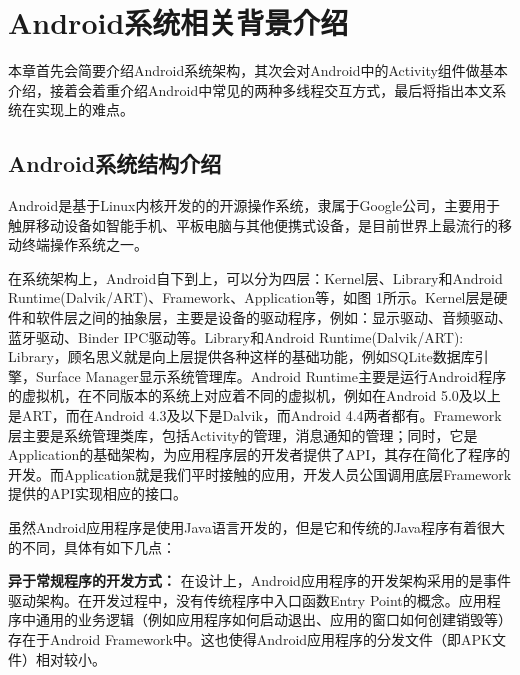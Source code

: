 \section{Android系统相关背景介绍 }  
\label{ch2}


本章首先会简要介绍Android系统架构，其次会对Android中的Activity组件做基本介绍，接着会着重介绍Android中常见的两种多线程交互方式，最后将指出本文系统在实现上的难点。

\subsection{Android系统结构介绍}

Android是基于Linux内核开发的的开源操作系统，隶属于Google公司，主要用于触屏移动设备如智能手机、平板电脑与其他便携式设备，是目前世界上最流行的移动终端操作系统之一。

在系统架构上，Android自下到上，可以分为四层：Kernel层、Library和Android Runtime(Dalvik/ART)、Framework、Application等，如图 1所示。Kernel层是硬件和软件层之间的抽象层，主要是设备的驱动程序，例如：显示驱动、音频驱动、蓝牙驱动、Binder IPC驱动等。Library和Android Runtime(Dalvik/ART): Library，顾名思义就是向上层提供各种这样的基础功能，例如SQLite数据库引擎，Surface Manager显示系统管理库。Android Runtime主要是运行Android程序的虚拟机，在不同版本的系统上对应着不同的虚拟机，例如在Android 5.0及以上是ART，而在Android 4.3及以下是Dalvik，而Android 4.4两者都有。Framework层主要是系统管理类库，包括Activity的管理，消息通知的管理；同时，它是Application的基础架构，为应用程序层的开发者提供了API，其存在简化了程序的开发。而Application就是我们平时接触的应用，开发人员公国调用底层Framework提供的API实现相应的接口。

虽然Android应用程序是使用Java语言开发的，但是它和传统的Java程序有着很大的不同，具体有如下几点：

\textbf{异于常规程序的开发方式：}
在设计上，Android应用程序的开发架构采用的是事件驱动架构。在开发过程中，没有传统程序中入口函数Entry Point的概念。应用程序中通用的业务逻辑（例如应用程序如何启动退出、应用的窗口如何创建销毁等）存在于Android Framework中。这也使得Android应用程序的分发文件（即APK文件）相对较小。

